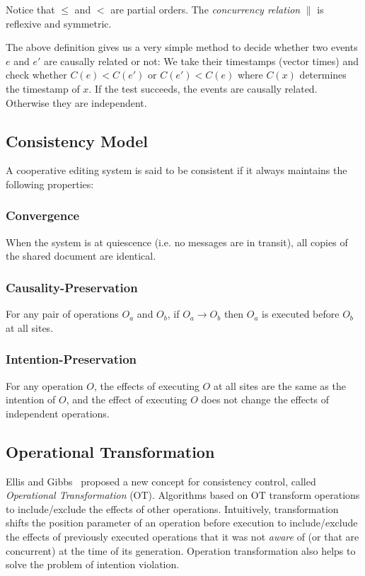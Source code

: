 Notice that $\leq$ and $<$ are partial orders. The \emph{concurrency relation} 
$\parallel$ is reflexive and symmetric.

The above definition gives us a very simple method to decide whether two events 
$e$ and $e'$ are causally related or not: We take their timestamps (vector 
times) and check whether $C(e) < C(e')$ or $C(e') < C(e)$ where $C(x)$ 
determines the timestamp of $x$. If the test succeeds, the events are causally 
related. Otherwise they are independent.


\subsection{Consistency Model}
A cooperative editing system is said to be consistent if it always maintains the
following properties:

\subsubsection{Convergence} 
When the system is at quiescence (i.e. no messages are
in transit), all copies of the shared document are identical.

\subsubsection{Causality-Preservation} 
For any pair of operations $O_a$ and $O_b$,
if $O_a \rightarrow O_b$ then $O_a$ is executed before $O_b$ at all sites.

\subsubsection{Intention-Preservation} 
For any operation $O$, the effects of
executing $O$ at all sites are the same as the intention of $O$, and the effect
of executing $O$ does not change the effects of independent operations.


\subsection{Operational Transformation}
{Ellis and Gibbs}~\cite{ellis} proposed a new concept for
consistency control, called \emph{Operational Transformation} (OT). 
Algorithms based on OT transform operations to include/exclude the effects of other operations. 
Intuitively, transformation shifts the position parameter of an
operation before execution to include/exclude the effects of previously executed
operations that it was not \emph{aware} of (or that are concurrent) at the
time of its generation. Operation transformation also helps to solve the
problem of intention violation.

